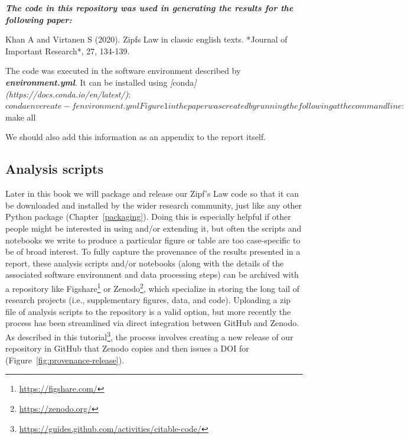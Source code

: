 \documentclass[
]{krantz}
\makeatletter
\newenvironment{Shaded}{\begin{snugshade}}{\end{snugshade}}
\newcommand{\AnnotationTok}[1]{\textcolor[rgb]{0.56,0.35,0.01}{\textbf{\textit{#1}}}}
\newcommand{\CommentTok}[1]{\textcolor[rgb]{0.56,0.35,0.01}{\textit{#1}}}
\newcommand{\InformationTok}[1]{\textcolor[rgb]{0.56,0.35,0.01}{\textbf{\textit{#1}}}}
\newcommand{\NormalTok}[1]{#1}
\newcommand{\OtherTok}[1]{\textcolor[rgb]{0.56,0.35,0.01}{#1}}
\renewcommand{\href}[2]{#2\footnote{\url{#1}}}
\newenvironment{kframe}{%
\medskip{}
\setlength{\fboxsep}{.8em}
 \def\at@end@of@kframe{}%
 \ifinner\ifhmode%
  \def\at@end@of@kframe{\end{minipage}}%
  \begin{minipage}{\columnwidth}%
 \fi\fi%
 \def\FrameCommand##1{\hskip\@totalleftmargin \hskip-\fboxsep
 \colorbox{shadecolor}{##1}\hskip-\fboxsep
     \hskip-\linewidth \hskip-\@totalleftmargin \hskip\columnwidth}%
 \MakeFramed {\advance\hsize-\width
   \@totalleftmargin\z@ \linewidth\hsize
   \@setminipage}}%
 {\par\unskip\endMakeFramed%
 \at@end@of@kframe}
\renewenvironment{Shaded}{\begin{kframe}}{\end{kframe}}
\makeatother
\begin{document}
\begin{Shaded}
\begin{Highlighting}[]
\AnnotationTok{The code in this repository was used in generating the results for the following paper:}

\NormalTok{Khan A and Virtanen S (2020). Zipf\textquotesingle{}s Law in classic english texts.}
\NormalTok{*Journal of Important Research*, 27, 134{-}139. }

\NormalTok{The code was executed in the software environment described by }\InformationTok{\textasciigrave{}environment.yml\textasciigrave{}}\NormalTok{.}
\NormalTok{It can be installed using }\CommentTok{[}\OtherTok{conda}\CommentTok{](https://docs.conda.io/en/latest/)}\NormalTok{:}
\NormalTok{$ conda env create {-}f environment.yml}

\NormalTok{Figure 1 in the paper was created by running the following at the command line:}
\NormalTok{$ make all}
\end{Highlighting}
\end{Shaded}

We should also add this information as an appendix to the report itself.

\hypertarget{provenance-code-scripts}{%
\subsection{Analysis scripts}\label{provenance-code-scripts}}

Later in this book we will package and release our Zipf's Law code
so that it can be downloaded and installed by the wider research community,
just like any other Python package (Chapter~\ref{packaging}).
Doing this is especially helpful if other people might be interested in using and/or extending it,
but often the scripts and notebooks we write to produce a particular figure or table
are too case-specific to be of broad interest.
To fully capture the provenance of the results presented in a report,
these analysis scripts and/or notebooks
(along with the details of the associated software environment and data processing steps)
can be archived with a repository like \href{https://figshare.com/}{Figshare} or \href{https://zenodo.org/}{Zenodo},
which specialize in storing the long tail of research projects
(i.e., supplementary figures, data, and code).
Uploading a zip file of analysis scripts to the repository is a valid option,
but more recently the process has been streamlined via direct integration
between GitHub and Zenodo.
As described in \href{https://guides.github.com/activities/citable-code/}{this tutorial},
the process involves creating a new release of our repository in GitHub
that Zenodo copies and then issues a DOI for (Figure~\ref{fig:provenance-release}).
\end{document}
